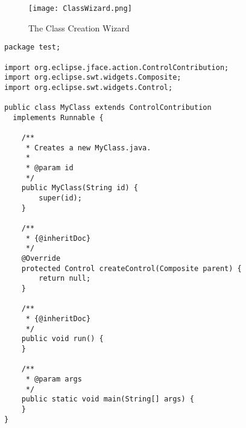 \begin{figure}[ClassWizard]
  \centering
  \texttt{[image: ClassWizard.png]}
  \caption[The Class Creation Wizard]%
  {The Class Creation Wizard\protect}
  \label{fig:ClassWizard}
\end{figure}


\begin{lstlisting}
package test;

import org.eclipse.jface.action.ControlContribution;
import org.eclipse.swt.widgets.Composite;
import org.eclipse.swt.widgets.Control;

public class MyClass extends ControlContribution 
  implements Runnable {

    /**
     * Creates a new MyClass.java.
     * 
     * @param id
     */
    public MyClass(String id) {
        super(id);
    }

    /**
     * {@inheritDoc}
     */
    @Override
    protected Control createControl(Composite parent) {
        return null;
    }

    /**
     * {@inheritDoc}
     */
    public void run() {
    }

    /**
     * @param args
     */
    public static void main(String[] args) {
    }
}
\end{lstlisting}

